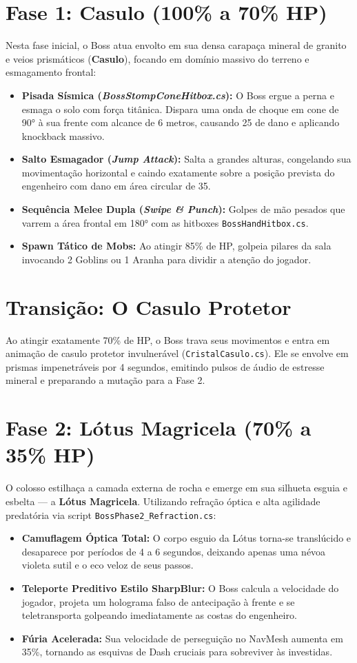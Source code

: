 \documentclass[a4paper,12pt]{report}
\begin{document}
\section{Fase 1: Casulo (100\% a 70\% HP)}
Nesta fase inicial, o Boss atua envolto em sua densa carapaça mineral de granito e veios prismáticos (\textbf{Casulo}), focando em domínio massivo do terreno e esmagamento frontal:
\begin{itemize}
    \item \textbf{Pisada Sísmica (\textit{BossStompConeHitbox.cs}):} O Boss ergue a perna e esmaga o solo com força titânica. Dispara uma onda de choque em cone de 90° à sua frente com alcance de 6 metros, causando 25 de dano e aplicando knockback massivo.
    \item \textbf{Salto Esmagador (\textit{Jump Attack}):} Salta a grandes alturas, congelando sua movimentação horizontal e caindo exatamente sobre a posição prevista do engenheiro com dano em área circular de 35.
    \item \textbf{Sequência Melee Dupla (\textit{Swipe \& Punch}):} Golpes de mão pesados que varrem a área frontal em 180° com as hitboxes \texttt{BossHandHitbox.cs}.
    \item \textbf{Spawn Tático de Mobs:} Ao atingir 85\% de HP, golpeia pilares da sala invocando 2 Goblins ou 1 Aranha para dividir a atenção do jogador.
\end{itemize}

\section{Transição: O Casulo Protetor}
Ao atingir exatamente 70\% de HP, o Boss trava seus movimentos e entra em animação de casulo protetor invulnerável (\texttt{CristalCasulo.cs}). Ele se envolve em prismas impenetráveis por 4 segundos, emitindo pulsos de áudio de estresse mineral e preparando a mutação para a Fase 2.

\section{Fase 2: Lótus Magricela (70\% a 35\% HP)}
O colosso estilhaça a camada externa de rocha e emerge em sua silhueta esguia e esbelta --- a \textbf{Lótus Magricela}. Utilizando refração óptica e alta agilidade predatória via script \texttt{BossPhase2\_Refraction.cs}:
\begin{itemize}
    \item \textbf{Camuflagem Óptica Total:} O corpo esguio da Lótus torna-se translúcido e desaparece por períodos de 4 a 6 segundos, deixando apenas uma névoa violeta sutil e o eco veloz de seus passos.
    \item \textbf{Teleporte Preditivo Estilo SharpBlur:} O Boss calcula a velocidade do jogador, projeta um holograma falso de antecipação à frente e se teletransporta golpeando imediatamente as costas do engenheiro.
    \item \textbf{Fúria Acelerada:} Sua velocidade de perseguição no NavMesh aumenta em 35\%, tornando as esquivas de Dash cruciais para sobreviver às investidas.
\end{itemize}
\end{document}

